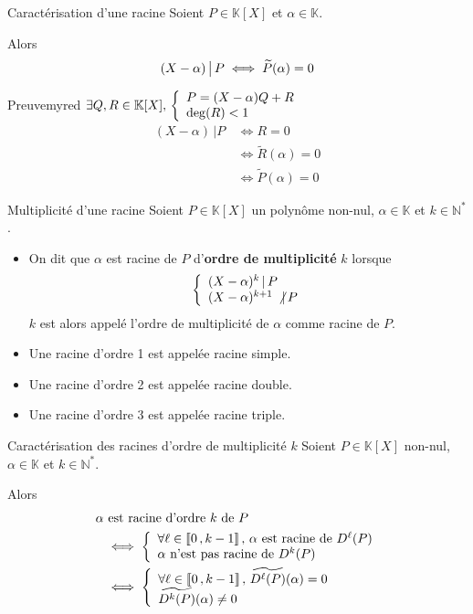     \begin{theo}{Caractérisation d’une racine}{}
        Soient $P \in \mathbb{K}[X]$ et $\alpha \in \mathbb{K}$.
    
        Alors \[ (X-\alpha) \, \big| \, P \iff \widetilde{P}(\alpha) = 0 \] 
    \end{theo}
    
    \begin{demo}{Preuve}{myred}
        $\exists Q,R \in \mathbb{K}[X], \, \et{P = (X-\alpha)Q + R}{ \deg(R) < 1}$
        \begin{align*}
            (X-\alpha) \, | P \, & \iff R = 0 \\
            & \iff \tilde{R}(\alpha) = 0 \\
            & \iff \tilde{P}(\alpha) = 0
        \end{align*}
    \end{demo}

    \begin{defi}{Multiplicité d’une racine}{}
        Soient $P \in \mathbb{K}[X]$ un polynôme non-nul, $\alpha \in \mathbb{K}$ et $k \in \mathbb{N}^*$.
        \begin{itemize}
            \item On dit que $\alpha$ est racine de $P$ d’\textbf{ordre de multiplicité} $k$ lorsque \[ \et{(X-\alpha)^k \, | \, P}{(X - \alpha)^{k+1} \, \not| \, P} \] 
            $k$ est alors appelé l’ordre de multiplicité de $\alpha$ comme racine de $P$.
            \item Une racine d’ordre 1 est appelée racine simple.
            \item Une racine d’ordre 2 est appelée racine double.
            \item Une racine d’ordre 3 est appelée racine triple.
        \end{itemize}
    \end{defi}
    
    \begin{theo}{Caractérisation des racines d’ordre de multiplicité $k$}{}
        Soient $P \in \mathbb{K}[X]$ non-nul, $\alpha \in \mathbb{K}$ et $k \in \mathbb{N}^*$. 
    
        Alors \begin{align*}
            \alpha & \text{ est racine d’ordre } k \text{ de } P \\
            & \iff \et{\forall \ell \in \intervalleEntier{0}{k-1}, \, \alpha \text{ est racine de } D^{\ell}(P)}{\alpha \text{ n’est pas racine de } D^k(P)} \\
            & \iff \et{\forall \ell \in \intervalleEntier{0}{k-1}, \, \widetilde{D^{\ell}(P)}(\alpha) = 0}{\widetilde{D^k(P)}(\alpha) \neq 0}
            \end{align*}
    \end{theo}
    
